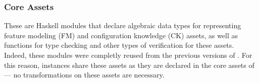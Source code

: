 






\subsubsection{Core Assets} \label{core-assets}

These are Haskell modules that declare algebraic data types for representing
feature modeling (FM) and configuration knowledge (CK) assets, as well as functions for
type checking and other types of verification for these assets. Indeed, these modules
were completly reused from the previous versions of \hp. For this reason, \hpl{} instances
share these assets as they are declared in the core assets of \hpl---
no transformations on these assets are necessary.

